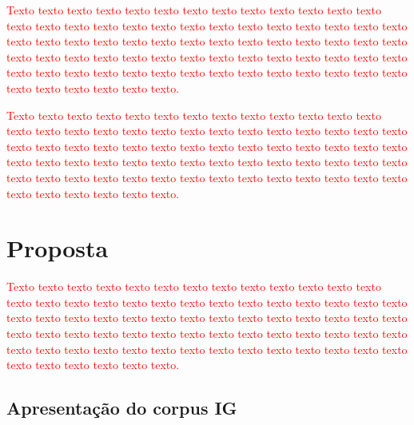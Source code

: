 \documentclass[normaltoc, espacoumemeio, pnumromarab,ruledheader]{abnt}
\begin{document}
\textcolor{red}{Texto texto texto texto texto texto texto texto texto texto texto texto texto texto texto texto texto texto texto texto texto texto texto texto texto texto texto texto texto texto texto texto texto texto texto texto texto texto texto texto texto texto texto texto texto texto texto texto texto texto texto texto texto texto texto texto texto texto texto texto texto texto texto texto texto texto texto texto texto texto texto texto texto texto texto.}

\textcolor{red}{Texto texto texto texto texto texto texto texto texto texto texto texto texto texto texto texto texto texto texto texto texto texto texto texto texto texto texto texto texto texto texto texto texto texto texto texto texto texto texto texto texto texto texto texto texto texto texto texto texto texto texto texto texto texto texto texto texto texto texto texto texto texto texto texto texto texto texto texto texto texto texto texto texto texto texto.}

\chapter{Proposta}




\textcolor{red}{Texto texto texto texto texto texto texto texto texto texto texto texto texto texto texto texto texto texto texto texto texto texto texto texto texto texto texto texto texto texto texto texto texto texto texto texto texto texto texto texto texto texto texto texto texto texto texto texto texto texto texto texto texto texto texto texto texto texto texto texto texto texto texto texto texto texto texto texto texto texto texto texto texto texto texto.}

\section{Apresentação do corpus IG}

\end{document}
